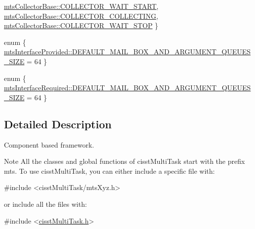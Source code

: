 \begin{DoxyCompactItemize}
\hyperlink{group__cisst_multi_task_ggadfbc058665584a56933a7997229c1fb6a67657229ff967c447ed3289c730bdf11}{mts\+Collector\+Base\+::\+C\+O\+L\+L\+E\+C\+T\+O\+R\+\_\+\+W\+A\+I\+T\+\_\+\+S\+T\+A\+R\+T}, 
\hyperlink{group__cisst_multi_task_ggadfbc058665584a56933a7997229c1fb6a9162148874993d7a2bf7a40bd5b1ad24}{mts\+Collector\+Base\+::\+C\+O\+L\+L\+E\+C\+T\+O\+R\+\_\+\+C\+O\+L\+L\+E\+C\+T\+I\+N\+G}, 
\hyperlink{group__cisst_multi_task_ggadfbc058665584a56933a7997229c1fb6a84e8e4233359e044e0f7db8ddc04f8c5}{mts\+Collector\+Base\+::\+C\+O\+L\+L\+E\+C\+T\+O\+R\+\_\+\+W\+A\+I\+T\+\_\+\+S\+T\+O\+P}
 \}
\item 
enum \{ \hyperlink{group__cisst_multi_task_ggaa7ef9189c81a481484a7f70bdd60b0d6a33b84c3e16f4aac5a431ebd0f1aa848f}{mts\+Interface\+Provided\+::\+D\+E\+F\+A\+U\+L\+T\+\_\+\+M\+A\+I\+L\+\_\+\+B\+O\+X\+\_\+\+A\+N\+D\+\_\+\+A\+R\+G\+U\+M\+E\+N\+T\+\_\+\+Q\+U\+E\+U\+E\+S\+\_\+\+S\+I\+Z\+E} = 64
 \}
\item 
enum \{ \hyperlink{group__cisst_multi_task_ggafd977b8e5e4045ee10a68ff31e16a852a8b550bffbc9fcc1c50e42b45d36eaaec}{mts\+Interface\+Required\+::\+D\+E\+F\+A\+U\+L\+T\+\_\+\+M\+A\+I\+L\+\_\+\+B\+O\+X\+\_\+\+A\+N\+D\+\_\+\+A\+R\+G\+U\+M\+E\+N\+T\+\_\+\+Q\+U\+E\+U\+E\+S\+\_\+\+S\+I\+Z\+E} = 64
 \}
\end{DoxyCompactItemize}


\subsection{Detailed Description}
Component based framework.

\begin{DoxyNote}{Note}
All the classes and global functions of cisst\+Multi\+Task start with the prefix mts. To use cisst\+Multi\+Task, you can either include a specific file with\+: 
\begin{DoxyCode}
\textcolor{preprocessor}{#include <cisstMultiTask/mtsXyz.h>}
\end{DoxyCode}
 or include all the files with\+: 
\begin{DoxyCode}
\textcolor{preprocessor}{#include <\hyperlink{cisst_multi_task_8h}{cisstMultiTask.h}>}
\end{DoxyCode}
 
\end{DoxyNote}


